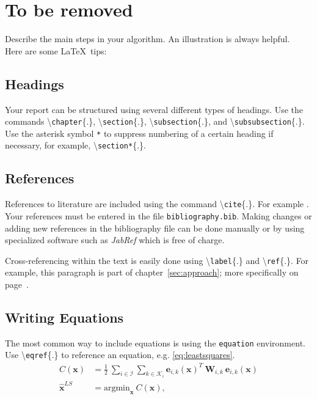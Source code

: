 \chapter{To be removed}
\label{cha:chapter_name}



Describe the main steps in your algorithm. An illustration is always helpful.\\

Here are some \LaTeX~tips:


\section{Headings}

  Your report can be structured using several different types of headings. Use the commands \textbackslash\texttt{chapter}\{.\}, \textbackslash\texttt{section}\{.\}, \textbackslash\texttt{subsection}\{.\}, and \textbackslash\texttt{subsubsection}\{.\}. Use the asterisk symbol \texttt{*} to suppress numbering of a certain heading if necessary, for example, \textbackslash\texttt{section*}\{.\}.


\section{References}\label{sec:references}

  References to literature are included using the command \textbackslash\texttt{cite}\{.\}. For example \cite{KleinMurray2007,Strasdat2010WhyFilter}. Your references must be entered in the file \texttt{bibliography.bib}. Making changes or adding new references in the bibliography file can be done manually or by using specialized software such as \textit{JabRef} which is free of charge.

  Cross-referencing within the text is easily done using \textbackslash\texttt{label}\{.\} and \textbackslash\texttt{ref}\{.\}. For example, this paragraph is part of chapter~\ref{sec:approach}; more specifically on page~\pageref{sec:references}.

\section{Writing Equations}\label{sec:math}

  The most common way to include equations is using the \texttt{equation} environment. Use \textbackslash\texttt{eqref}\{.\} to reference an equation, e.g. \eqref{eq:leastsquares}.
  \begin{equation}\label{eq:leastsquares}
      \begin{aligned}
        C(\mathbf{x}) &= \frac{1}{2} \ \sum_{i \in \mathcal I} \sum_{k \in \mathcal K_i} \mathbf{e}_{i,k}(\mathbf{x})^T \ \mathbf{W}_{i,k}  \ \mathbf{e}_{i,k}(\mathbf{x})  \\
        \hat{\mathbf{x}}^{LS} &= \text{argmin}_\mathbf{x} \ C(\mathbf{x}),
      \end{aligned}
  \end{equation}

